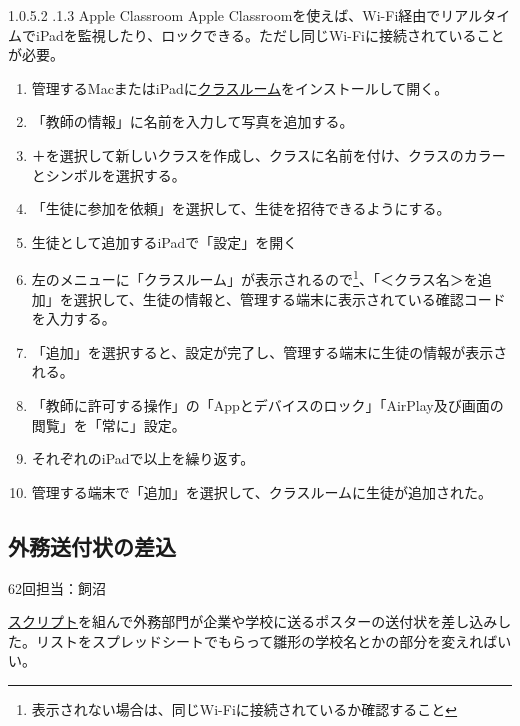 \documentclass[dvipdfmx,jb5]{jarticle}
\makeatletter
\newcommand{\subsubsubsection}{\@startsection{paragraph}{4}{\z@}%
    {1.0\Cvs \@plus.5\Cdp \@minus.2\Cdp}%
    {.1\Cvs \@plus.3\Cdp}%
    {\reset@font}
  }
\newcommand{\link}[2]{\href{#2}{#1}}
\makeatother
\begin{document}
  \subsubsubsection{Apple Classroom}
  Apple Classroomを使えば、Wi-Fi経由でリアルタイムでiPadを監視したり、ロックできる。ただし同じWi-Fiに接続されていることが必要。
  \begin{enumerate}[手順1.]
   \item 管理するMacまたはiPadに\link{クラスルーム}{https://apple.co/3DShnKU}をインストールして開く。
   \item 「教師の情報」に名前を入力して写真を追加する。
   \item ＋を選択して新しいクラスを作成し、クラスに名前を付け、クラスのカラーとシンボルを選択する。
   \item 「生徒に参加を依頼」を選択して、生徒を招待できるようにする。
   \item 生徒として追加するiPadで「設定」を開く
   \item 左のメニューに「クラスルーム」が表示されるので\footnote{表示されない場合は、同じWi-Fiに接続されているか確認すること}、「＜クラス名＞を追加」を選択して、生徒の情報と、管理する端末に表示されている確認コードを入力する。
   \item 「追加」を選択すると、設定が完了し、管理する端末に生徒の情報が表示される。
   \item 「教師に許可する操作」の「Appとデバイスのロック」「AirPlay及び画面の閲覧」を「常に」設定。
   \item それぞれのiPadで以上を繰り返す。
   \item 管理する端末で「追加」を選択して、クラスルームに生徒が追加された。
  \end{enumerate}

\subsection{外務送付状の差込}\label{sec:外務送付状の差込}
62回担当：飼沼

\href{https://script.google.com/d/1peO_Bmf9jcnJWGCZMN2IRhBrCqokkgPmUVuC4BlryH9kxAiHoXzkjO_x/edit?usp=sharing}{スクリプト}を組んで外務部門が企業や学校に送るポスターの送付状を差し込みした。リストをスプレッドシートでもらって雛形の学校名とかの部分を変えればいい。
\end{document}
